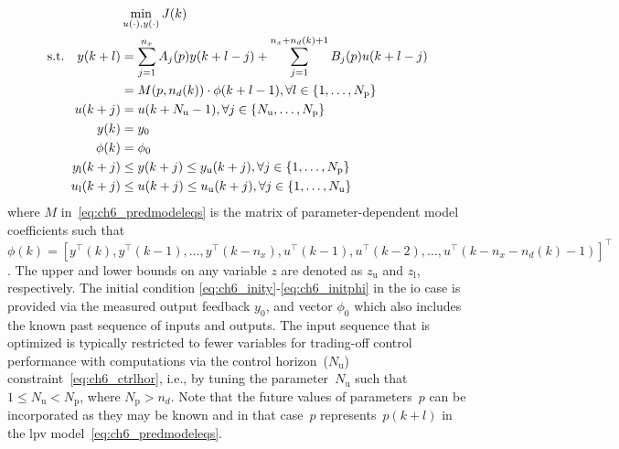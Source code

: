 \small
\vspace{-1em}
\begin{subequations}\label{eq:ch6_mpcopt}
\begin{align}
  & \min_{u(\cdot), y(\cdot)} J(k) \nonumber\\
  \text{s.t.}\quad y(k+l) &= \sum_{j=1}^{n_x} A_j(p) y(k+l-j) %
  + \sum_{j=1}^{n_x+n_d(k)+1} B_j(p) u(k+l-j)\notag\\
   &= M(p, n_d(k))  \cdot\phi(k+l-1),\forall l \in \{1,\ldots,N_{\text{p}}\} \label{eq:ch6_predmodeleqs}\\
  u(k+j) &= u(k+N_{\text{u}}-1), \forall j \in \{N_{\text{u}},\ldots,N_{\text{p}}\}\label{eq:ch6_ctrlhor}\\  
  y(k) &= y_0 \label{eq:ch6_inity}\\
  \phi(k) &= \phi_0~\label{eq:ch6_initphi}\\
  y_{\text{l}}(k+j) & \leq y(k+j) \leq y_{\text{u}}(k+j), \forall j \in \{1,\ldots,N_{\text{p}}\}\label{eq:ch6_ybounds}\\
  u_{\text{l}}(k+j) & \leq u(k+j) \leq u_{\text{u}}(k+j), \forall j \in \{1,\ldots,N_{\text{u}}\} \label{eq:ch6_ubounds}
\end{align}
\end{subequations}
\normalsize
where $M$ in~\eqref{eq:ch6_predmodeleqs} is the matrix of parameter-dependent model coefficients such that $\phi(k) = [y^{\top}(k),y^{\top}(k-1),\ldots,y^{\top}(k-n_x), u^{\top}(k-1), u^{\top}(k-2),\ldots,u^{\top}(k-n_x-n_d(k)-1)]^{\top}$. The upper and lower bounds on any variable $z$ are denoted as $z_{\text{u}}$ and $z_{\text{l}}$, respectively. The initial condition \eqref{eq:ch6_inity}-\eqref{eq:ch6_initphi} in the \gls{io} case is provided via the measured output feedback $y_0$, and vector $\phi_0$ which also includes the known past sequence of inputs and outputs. The input sequence that is optimized is typically restricted to fewer variables for trading-off control performance with computations via the control horizon~($N_{\text{u}}$) constraint~\eqref{eq:ch6_ctrlhor}, i.e., by tuning the parameter~$N_{\text{u}}$ such that $1\leq N_{\text{u}}<N_{\text{p}}$, where $N_{\text{p}}>n_d$. 
Note that the future values of parameters~$p$ can be incorporated as they may be known and in that case~$p$ represents~$p(k+l)$ in the \gls{lpv} model~\eqref{eq:ch6_predmodeleqs}.

